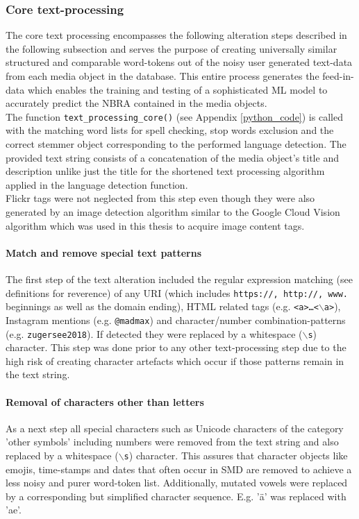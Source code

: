 \subsubsection*{Core text-processing} \label{core_text_processing}
The core text processing encompasses the following alteration steps described in the following subsection and serves the purpose of creating universally similar structured and comparable word-tokens out of the noisy user generated text-data from each media object in the database. This entire process generates the feed-in-data which enables the training and testing of a sophisticated ML model to accurately predict the NBRA contained in the media objects.\\
The function \texttt{text\_processing\_core()} (see Appendix \ref{python_code}) is called with the matching word lists for spell checking, stop words exclusion and the correct stemmer object corresponding to the performed language detection. The provided text string consists of a concatenation of the media object's title and description unlike just the title for the shortened text processing algorithm applied in the language detection function.\\
Flickr tags were not neglected from this step even though they were also generated by an image detection algorithm similar to the Google Cloud Vision algorithm which was used in this thesis to acquire image content tags.

\paragraph*{Match and remove special text patterns} \label{text_patterns}
The first step of the text alteration included the regular expression matching (see definitions for reverence) of any URI (which includes \texttt{https://, http://, www.} beginnings as well as the domain ending), HTML related tags (e.g. \texttt{<a>\dots<$\backslash$a>}), Instagram mentions (e.g. \texttt{@madmax}) and character/number combination-patterns (e.g. \texttt{zugersee2018}). If detected they were replaced by a whitespace (\texttt{$\backslash$s}) character. This step was done prior to any other text-processing step due to the high risk of creating character artefacts which occur if those patterns remain in the text string.

\paragraph*{Removal of characters other than letters} \label{remove_eveything_but_letters}
As a next step all special characters such as Unicode characters of the category 'other symbols' including numbers were removed from the text string and also replaced by a whitespace (\texttt{$\backslash$s}) character. This assures that character objects like emojis, time-stamps and dates that often occur in SMD are removed to achieve a less noisy and purer word-token list. Additionally, mutated vowels were replaced by a corresponding but simplified character sequence. E.g. '\"a' was replaced with 'ae'.

